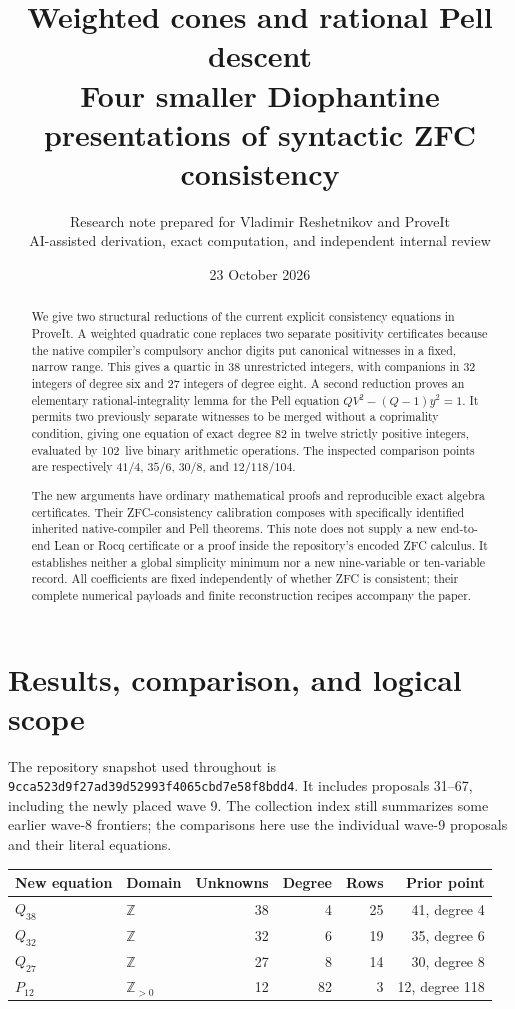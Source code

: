 \documentclass[11pt]{article}
\title{Weighted cones and rational Pell descent\\\large Four smaller Diophantine presentations of syntactic ZFC consistency}
\author{Research note prepared for Vladimir Reshetnikov and ProveIt\\\small AI-assisted derivation, exact computation, and independent internal review}
\date{23 October 2026}
\theoremstyle{remark}\newtheorem{remark}[theorem]{Remark}
\newcommand{\Z}{\mathbb Z}\newcommand{\Q}{\mathbb Q}\newcommand{\N}{\mathbb N}\newcommand{\Pos}{\operatorname{Pos}}\newcommand{\Cone}{\mathcal C}\newcommand{\Con}{\operatorname{Con}}
\newcommand{\pin}{\nolinkurl{9cca523d9f27ad39d52993f4065cbd7e58f8bdd4}}
\newcommand{\Pcost}{102}
\begin{document}
\maketitle
\begin{abstract}
We give two structural reductions of the current explicit consistency equations in ProveIt. A weighted quadratic cone replaces two separate positivity certificates because the native compiler's compulsory anchor digits put canonical witnesses in a fixed, narrow range. This gives a quartic in 38 unrestricted integers, with companions in 32 integers of degree six and 27 integers of degree eight. A second reduction proves an elementary rational-integrality lemma for the Pell equation $QV^2-(Q-1)y^2=1$. It permits two previously separate witnesses to be merged without a coprimality condition, giving one equation of exact degree 82 in twelve strictly positive integers, evaluated by \Pcost\ live binary arithmetic operations. The inspected comparison points are respectively $41/4$, $35/6$, $30/8$, and $12/118/104$.

The new arguments have ordinary mathematical proofs and reproducible exact algebra certificates. Their ZFC-consistency calibration composes with specifically identified inherited native-compiler and Pell theorems. This note does not supply a new end-to-end Lean or Rocq certificate or a proof inside the repository's encoded ZFC calculus. It establishes neither a global simplicity minimum nor a new nine-variable or ten-variable record. All coefficients are fixed independently of whether ZFC is consistent; their complete numerical payloads and finite reconstruction recipes accompany the paper.
\end{abstract}
\newpage
\tableofcontents
\newpage

\section{Results, comparison, and logical scope}

The repository snapshot used throughout is \pin. It includes proposals 31--67, including the newly placed wave 9. The collection index still summarizes some earlier wave-8 frontiers; the comparisons here use the individual wave-9 proposals and their literal equations.

\begin{center}\small
\begin{tabular}{llrrrr}
\toprule
New equation & Domain & Unknowns & Degree & Rows & Prior point\\
\midrule
$Q_{38}$ & $\Z$ & 38 & 4 & 25 & 41, degree 4\\
$Q_{32}$ & $\Z$ & 32 & 6 & 19 & 35, degree 6\\
$Q_{27}$ & $\Z$ & 27 & 8 & 14 & 30, degree 8\\
$P_{12}$ & $\Z_{>0}$ & 12 & 82 & 3 & 12, degree 118\\
\bottomrule
\end{tabular}
\end{center}
\end{document}
